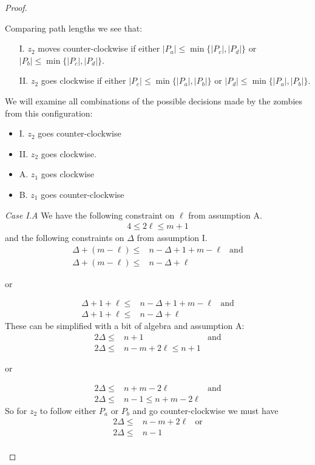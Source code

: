 \begin{proof}
\begin{proofpart}
  Comparing path lengths we see that:

  \begin{itemize}
   \item[I.] $z_2$ moves counter-clockwise if either $|P_a| \leq \min \{ |P_c|, |P_d| \}$ or $|P_b| \leq \min \{ |P_c|, |P_d| \}$.

   \item[II.] $z_2$ goes clockwise if either $|P_c| \leq \min \{ |P_a|, |P_b| \}$ or $|P_d| \leq \min \{ |P_a|, |P_b| \}$.
  \end{itemize}

  We will examine all combinations of the possible decisions
  made by the zombies from this configuration:

  \begin{itemize}
   \item I. $z_2$ goes counter-clockwise
   \item II. $z_2$ goes clockwise.
   \item A. $z_1$ goes clockwise
   \item B. $z_1$ goes counter-clockwise
  \end{itemize}

  \textit{Case I.A} We have the following constraint on $\ell$ from
  assumption A.
  \begin{align*}
   4 \leq 2 \ell \leq m + 1
  \end{align*}
  and the following constraints on $\Delta$ from assumption I.
  \begin{align*}
   \Delta + (m - \ell) \leq & n - \Delta + 1 + m - \ell & \text{and} \\
   \Delta + (m - \ell) \leq & n - \Delta + \ell
  \end{align*}
  \begin{center}or\end{center}
  \begin{align*}
   \Delta + 1 + \ell \leq & n - \Delta + 1 + m - \ell & \text{and} \\
   \Delta + 1 + \ell \leq & n - \Delta + \ell
  \end{align*}
  These can be simplified with a bit of algebra and assumption A:
  \begin{align*}
   2 \Delta \leq & n+1                    & \text{and} \\
   2 \Delta \leq & n - m + 2\ell \leq n+1
  \end{align*}
  \begin{center}or\end{center}
  \begin{align*}
   2 \Delta \leq & n+m -2 \ell             & \text{and} \\
   2 \Delta \leq & n -1 \leq n + m - 2\ell
  \end{align*}
  So for $z_2$ to follow either $P_a$ or $P_b$ and go counter-clockwise we must have
  \begin{align*}
   2 \Delta \leq & n - m + 2\ell & \text{or} \\
   2 \Delta \leq & n - 1                     \\
  \end{align*}


\end{proofpart}
\end{proof}
